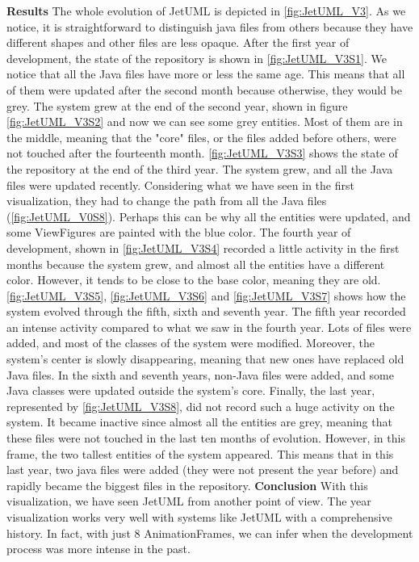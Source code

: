 \textbf{Results}
The whole evolution of JetUML is depicted in \autoref{fig:JetUML_V3}. As we notice, it is straightforward to distinguish java files from others because they have different shapes and other files are less opaque. After the first year of development, the state of the repository is shown in \autoref{fig:JetUML_V3S1}. We notice that all the Java files have more or less the same age. This means that all of them were updated after the second month because otherwise, they would be grey. The system grew at the end of the second year, shown in figure \autoref{fig:JetUML_V3S2} and now we can see some grey entities. Most of them are in the middle, meaning that the "core" files, or the files added before others, were not touched after the fourteenth month.  \autoref{fig:JetUML_V3S3} shows the state of the repository at the end of the third year. The system grew, and all the Java files were updated recently. Considering what we have seen in the first visualization, they had to change the path from all the Java files (\autoref{fig:JetUML_V0S8}). Perhaps this can be why all the entities were updated, and some ViewFigures are painted with the blue color. The fourth year of development, shown in  \autoref{fig:JetUML_V3S4} recorded a little activity in the first months because the system grew, and almost all the entities have a different color. However, it tends to be close to the base color, meaning they are old. 
\autoref{fig:JetUML_V3S5},  \autoref{fig:JetUML_V3S6} and  \autoref{fig:JetUML_V3S7} shows how the system evolved through the fifth, sixth and seventh year. The fifth year recorded an intense activity compared to what we saw in the fourth year. Lots of files were added, and most of the classes of the system were modified. Moreover, the system's center is slowly disappearing, meaning that new ones have replaced old Java files. In the sixth and seventh years, non-Java files were added, and some Java classes were updated outside the system's core. Finally, the last year, represented by \autoref{fig:JetUML_V3S8}, did not record such a huge activity on the system. It became inactive since almost all the entities are grey, meaning that these files were not touched in the last ten months of evolution. However, in this frame, the two tallest entities of the system appeared. This means that in this last year, two java files were added (they were not present the year before) and rapidly became the biggest files in the repository.  
\bigbreak
\textbf{Conclusion}
With this visualization, we have seen JetUML from another point of view. The year visualization works very well with systems like JetUML with a comprehensive history. In fact, with just 8 AnimationFrames, we can infer when the development process was more intense in the past. 


